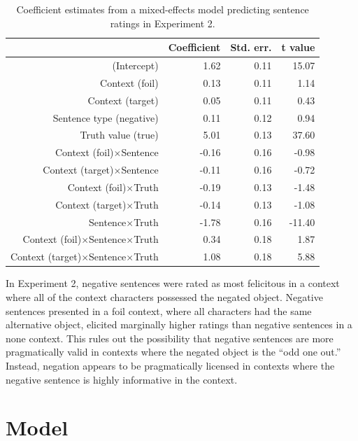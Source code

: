 \documentclass[10pt,letterpaper]{article}
\begin{document}
\begin{table}[t]
\caption{\label{tab:s2} Coefficient estimates from a mixed-effects model predicting sentence ratings in Experiment 2.}
\begin{center}
\small\addtolength{\tabcolsep}{-5pt}
\begin{tabular}{rrrr}
  \hline
 & Coefficient & Std. err. & t value \\ 
  \hline
(Intercept) & 1.62 & 0.11 & 15.07 \\ 
  Context (foil) & 0.13 & 0.11 & 1.14  \\ 
  Context (target) & 0.05 & 0.11 & 0.43  \\ 
  Sentence type (negative) & 0.11 & 0.12 & 0.94 \\
  Truth value (true) & 5.01 & 0.13 & 37.60 \\ 
  Context (foil)$\times$Sentence & -0.16 & 0.16 & -0.98 \\
  Context (target)$\times$Sentence & -0.11 & 0.16 & -0.72 \\
  Context (foil)$\times$Truth & -0.19 & 0.13 & -1.48 \\
  Context (target)$\times$Truth & -0.14 & 0.13 & -1.08 \\
  Sentence$\times$Truth & -1.78 & 0.16 & -11.40 \\
  Context (foil)$\times$Sentence$\times$Truth& 0.34 & 0.18 & 1.87 \\
  Context (target)$\times$Sentence$\times$Truth & 1.08 & 0.18 & 5.88 \\
   \hline
\end{tabular}
\end{center}
\end{table}

In Experiment 2, negative sentences were rated as most felicitous in  a context where all of the context characters possessed the negated object.  Negative sentences presented in a foil context, where all characters had the same alternative object, elicited  marginally higher ratings than negative sentences in a none context.  This rules out the possibility that negative sentences are more pragmatically valid in contexts where the negated object is the ``odd one out.''  Instead, negation appears to be pragmatically licensed in contexts where the negative sentence is highly informative in the context.  

\section{Model}
\end{document}
